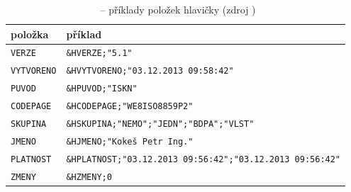 \begin{table}[H]
    \begin{tabular}{|l|l|} \hline položka & příklad \\ \hline \hline
\texttt{VERZE} & \texttt{\&HVERZE;"5.1"} \\ \hline \texttt{VYTVORENO}
& \texttt{\&HVYTVORENO;"03.12.2013 09:58:42"} \\ \hline \texttt{PUVOD}
& \texttt{\&HPUVOD;"ISKN"} \\ \hline \texttt{CODEPAGE} &
\texttt{\&HCODEPAGE;"WE8ISO8859P2"} \\ \hline \texttt{SKUPINA} &
\texttt{\&HSKUPINA;"NEMO";"JEDN";"BDPA";"VLST"} \\ \hline
\texttt{JMENO} & \texttt{\&HJMENO;"Kokeš Petr Ing."} \\ \hline
\texttt{PLATNOST} & \texttt{\&HPLATNOST;"03.12.2013
09:56:42";"03.12.2013 09:56:42"} \\ \hline \texttt{ZMENY} &
\texttt{\&HZMENY;0} \\ \hline
    \end{tabular} \centering
    \caption[~– příklady položek hlavičky]{~– příklady
položek hlavičky (zdroj \citep{struktura_vfk})}
    \label{tab:hlavicka_priklady}
\end{table}

